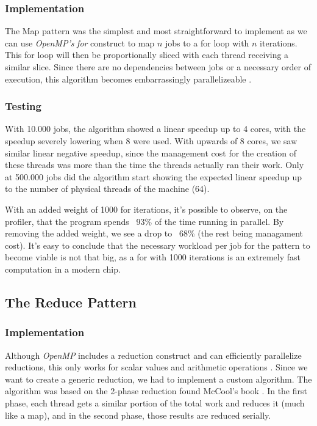 \documentclass[10pt,journal]{IEEEtran}
\begin{document}
\subsubsection{Implementation}

The Map pattern was the simplest and most straightforward to implement as we can use \textit{OpenMP's} \textit{for} construct to map $ n $ jobs to a for loop with $ n $ iterations. This for loop will then be proportionally sliced with each thread receiving a similar slice. Since there are no dependencies between jobs or a necessary order of execution, this algorithm becomes embarrassingly parallelizeable \cite{mccool}.

\subsubsection{Testing}

With 10.000 jobs, the algorithm showed a linear speedup up to 4 cores, with the speedup severely lowering when 8 were used. With upwards of 8 cores, we saw similar linear negative speedup, since the management cost for the creation of these threads was more than the time the threads actually ran their work. Only at 500.000 jobs did the algorithm start showing the expected linear speedup  up to the number of physical threads of the machine (64).

With an added weight of 1000 for iterations, it's possible to observe, on the profiler, that the program spends ~93\% of the time running in parallel. By removing the added weight, we see a drop to ~68\% (the rest being managament cost). It's easy to conclude that the necessary workload per job for the pattern to become viable is not that big, as a for with 1000 iterations is an extremely fast computation in a modern chip.

\subsection{The Reduce Pattern}
\label{reduce}

\subsubsection{Implementation}

Although \textit{OpenMP} includes a reduction construct and can efficiently parallelize reductions, this only works for scalar values and arithmetic operations \cite{ompreduct}. Since we want to create a generic reduction, we had to implement a custom algorithm. The algorithm was based on the 2-phase reduction found McCool's book \cite{mccool}. In the first phase, each thread gets a similar portion of the total work and reduces it (much like a map), and in the second phase, those results are reduced serially. 
\end{document}
